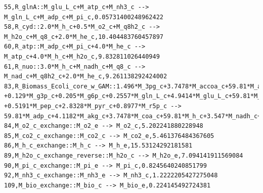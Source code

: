 \documentclass{article}
\begin{document}
\begin{landscape}
\begin{verbatim}
55,R_glnA::M_glu_L_c+M_atp_c+M_nh3_c --> M_gln_L_c+M_adp_c+M_pi_c,0.05731400248962422
58,R_cyd::2.0*M_h_c+0.5*M_o2_c+M_q8h2_c --> M_h2o_c+M_q8_c+2.0*M_he_c,10.404483760457897
60,R_atp::M_adp_c+M_pi_c+4.0*M_he_c --> M_atp_c+4.0*M_h_c+M_h2o_c,9.832811026440949
61,R_nuo::3.0*M_h_c+M_nadh_c+M_q8_c --> M_nad_c+M_q8h2_c+2.0*M_he_c,9.261138292424002
83,R_Biomass_Ecoli_core_w_GAM::1.496*M_3pg_c+3.7478*M_accoa_c+59.81*M_atp_c+0.361*M_e4p_c+0.0709*M_f6p_c
+0.129*M_g3p_c+0.205*M_g6p_c+0.2557*M_gln_L_c+4.9414*M_glu_L_c+59.81*M_h2o_c+3.547*M_nad_c+13.0279*M_nadph_c+1.7867*M_oaa_c
+0.5191*M_pep_c+2.8328*M_pyr_c+0.8977*M_r5p_c --> 
59.81*M_adp_c+4.1182*M_akg_c+3.7478*M_coa_c+59.81*M_h_c+3.547*M_nadh_c+13.0279*M_nadp_c+59.81*M_pi_c+M_bio_c,0.224145492724381
84,M_o2_c_exchange::M_o2_e --> M_o2_c,5.202241880228948
85,M_co2_c_exchange::M_co2_c --> M_co2_e,5.461376484367605
86,M_h_c_exchange::M_h_c --> M_h_e,15.53124292181581
89,M_h2o_c_exchange_reverse::M_h2o_c --> M_h2o_e,7.094141911569084
90,M_pi_c_exchange::M_pi_e --> M_pi_c,0.8245640240851799
92,M_nh3_c_exchange::M_nh3_e --> M_nh3_c,1.2222205427275048
109,M_bio_exchange::M_bio_c --> M_bio_e,0.224145492724381
\end{verbatim}


\end{landscape}
\end{document}
